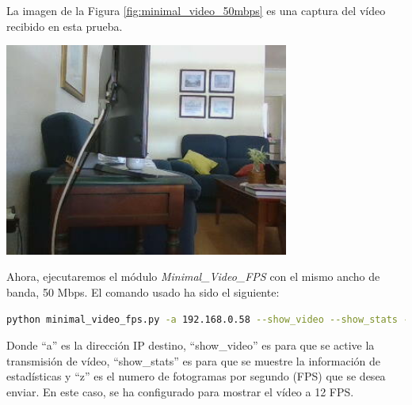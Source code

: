 \newpage

La imagen de la Figura \ref{fig:minimal_video_50mbps} es una captura del vídeo recibido en esta prueba.
\begin{center}
  \includegraphics[width = 0.7\textwidth]{images/VideoRecibido3.1.png}
  \label{fig:minimal_video_50mbps}
\end{center}

\newpage
Ahora, ejecutaremos el módulo \textit{Minimal\_Video\_FPS} con el mismo ancho de banda, 50 Mbps. El comando usado ha sido el siguiente:
\begin{lstlisting}[language=bash, basicstyle=\ttfamily\scriptsize]
    python minimal_video_fps.py -a 192.168.0.58 --show_video --show_stats -z 12
\end{lstlisting}
Donde ``a'' es la dirección IP destino, ``show\_video'' es para que se active la transmisión de vídeo, ``show\_stats'' es para que se muestre la información de estadísticas y ``z'' es el numero de fotogramas por segundo (FPS) que se desea enviar. En este caso, se ha configurado para mostrar el vídeo a 12 FPS.
\vspace{\baselineskip}

